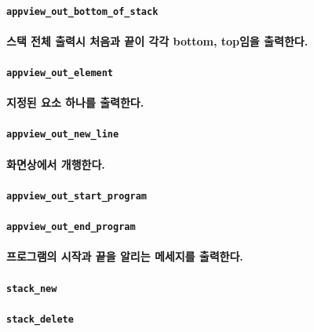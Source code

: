 \documentclass[UTF8]{report}
\begin{document}
            \paragraph{\texttt{appview\_out\_bottom\_of\_stack}}
            \paragraph{%
                \normalfont 스택 전체 출력시 처음과 끝이 각각 bottom, top임을 출력한다.
            }

            \paragraph{\texttt{appview\_out\_element}}
            \paragraph{%
                \normalfont 지정된 요소 하나를 출력한다.
            }
            
            \paragraph{\texttt{appview\_out\_new\_line}}
            \paragraph{%
                \normalfont 화면상에서 개행한다.
            }

            \paragraph{\texttt{appview\_out\_start\_program}}
            \paragraph{\texttt{appview\_out\_end\_program}}
            \paragraph{%
                \normalfont 프로그램의 시작과 끝을 알리는 메세지를 출력한다.
            }

            \paragraph{\texttt{stack\_new}}
            \paragraph{\texttt{stack\_delete}}
\end{document}
